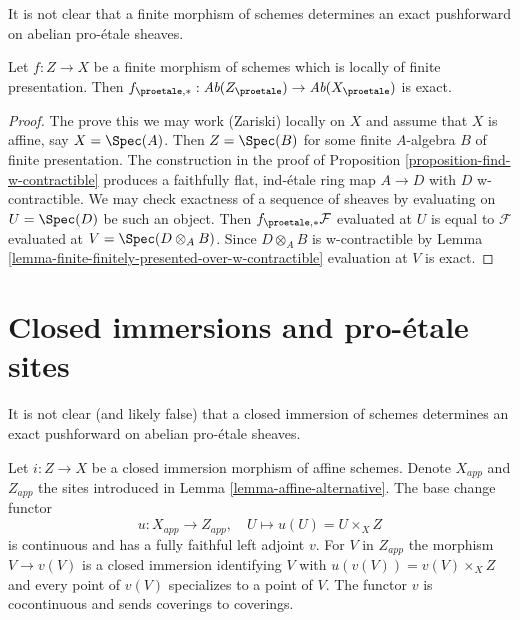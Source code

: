 \noindent
It is not clear that a finite morphism of schemes determines
an exact pushforward on abelian pro-\'etale sheaves.

\begin{lemma}
\label{lemma-finite}
Let $f : Z \to X$ be a finite morphism of schemes which is
locally of finite presentation. Then
$f_{\proetale, *} : \textit{Ab}(Z_\proetale) \to \textit{Ab}(X_\proetale)$
is exact.
\end{lemma}

\begin{proof}
The prove this we may work (Zariski) locally on $X$ and assume that $X$
is affine, say $X = \Spec(A)$. Then $Z = \Spec(B)$ for some finite
$A$-algebra $B$ of finite presentation. The construction in the proof of
Proposition \ref{proposition-find-w-contractible}
produces a faithfully flat, ind-\'etale ring map $A \to D$
with $D$ w-contractible. We may check exactness of a sequence of
sheaves by evaluating on $U = \Spec(D)$ be such an object. Then
$f_{\proetale, *}\mathcal{F}$
evaluated at $U$ is equal to $\mathcal{F}$ evaluated at
$V = \Spec(D \otimes_A B)$. Since $D \otimes_A B$ is w-contractible
by Lemma \ref{lemma-finite-finitely-presented-over-w-contractible}
evaluation at $V$ is exact.
\end{proof}








\section{Closed immersions and pro-\'etale sites}
\label{section-closed-immersion}

\noindent
It is not clear (and likely false) that a closed immersion of schemes
determines an exact pushforward on abelian pro-\'etale sheaves.

\begin{lemma}
\label{lemma-closed-immersion-affines}
Let $i : Z \to X$ be a closed immersion morphism of affine schemes.
Denote $X_{app}$ and $Z_{app}$ the sites introduced in
Lemma \ref{lemma-affine-alternative}.
The base change functor
$$
u : X_{app} \to Z_{app},\quad U \longmapsto u(U) = U \times_X Z
$$
is continuous and has a fully faithful left adjoint $v$.
For $V$ in $Z_{app}$ the morphism $V \to v(V)$ is a closed immersion
identifying $V$ with $u(v(V)) = v(V) \times_X Z$ and every point of
$v(V)$ specializes to a point of $V$.
The functor $v$ is cocontinuous and sends coverings to coverings.
\end{lemma}

